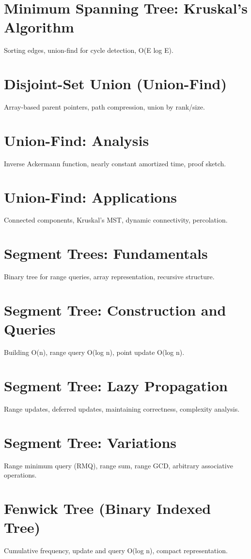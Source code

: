\chapter{Minimum Spanning Tree: Kruskal's Algorithm}
Sorting edges, union-find for cycle detection, O(E log E).

\chapter{Disjoint-Set Union (Union-Find)}
Array-based parent pointers, path compression, union by rank/size.

\chapter{Union-Find: Analysis}
Inverse Ackermann function, nearly constant amortized time, proof sketch.

\chapter{Union-Find: Applications}
Connected components, Kruskal's MST, dynamic connectivity, percolation.


\chapter{Segment Trees: Fundamentals}
Binary tree for range queries, array representation, recursive structure.

\chapter{Segment Tree: Construction and Queries}
Building O(n), range query O(log n), point update O(log n).

\chapter{Segment Tree: Lazy Propagation}
Range updates, deferred updates, maintaining correctness, complexity analysis.

\chapter{Segment Tree: Variations}
Range minimum query (RMQ), range sum, range GCD, arbitrary associative operations.

\chapter{Fenwick Tree (Binary Indexed Tree)}
Cumulative frequency, update and query O(log n), compact representation.

